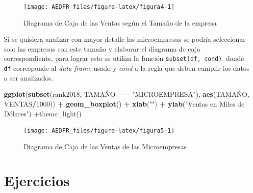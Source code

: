 \documentclass[letterpaper,]{book}
\newenvironment{Shaded}{\begin{snugshade}}{\end{snugshade}}
\newcommand{\DecValTok}[1]{\textcolor[rgb]{0.00,0.00,0.81}{#1}}
\newcommand{\KeywordTok}[1]{\textcolor[rgb]{0.13,0.29,0.53}{\textbf{#1}}}
\newcommand{\NormalTok}[1]{#1}
\newcommand{\OperatorTok}[1]{\textcolor[rgb]{0.81,0.36,0.00}{\textbf{#1}}}
\newcommand{\StringTok}[1]{\textcolor[rgb]{0.31,0.60,0.02}{#1}}
\begin{document}
\begin{figure}[h!]

{\centering \texttt{[image: AEDFR\_files/figure-latex/figura4-1]} 

}

\caption{Diagrama de Caja de las Ventas según el Tamaño de la empresa}\label{fig:figura4}
\end{figure}

Si se quisiera analizar con mayor detalle las microempresas se podría seleccionar solo las empresas con este tamaño y elaborar el diagrama de caja correspondiente, para lograr esto se utiliza la función \texttt{subset(df,\ cond)}. donde \texttt{df} corresponde al \emph{data frame} usado y \emph{cond} a la regla que deben cumplir los datos a ser analizados.

\begin{Shaded}
\begin{Highlighting}[]
\KeywordTok{ggplot}\NormalTok{(}\KeywordTok{subset}\NormalTok{(rank2018, TAMAÑO }\OperatorTok{==}\StringTok{ "MICROEMPRESA"}\NormalTok{), }\KeywordTok{aes}\NormalTok{(TAMAÑO, VENTAS}\OperatorTok{/}\DecValTok{1000}\NormalTok{)) }\OperatorTok{+}\StringTok{ }
\StringTok{  }\KeywordTok{geom_boxplot}\NormalTok{() }\OperatorTok{+}\StringTok{ }\KeywordTok{xlab}\NormalTok{(}\StringTok{""}\NormalTok{) }\OperatorTok{+}
\StringTok{  }\KeywordTok{ylab}\NormalTok{(}\StringTok{"Ventas en Miles de Dólares") +theme_light()}
\end{Highlighting}
\end{Shaded}

\begin{figure}[h!]

{\centering \texttt{[image: AEDFR\_files/figure-latex/figura5-1]} 

}

\caption{Diagrama de Caja de las Ventas de las Microempresas}\label{fig:figura5}
\end{figure}

\newpage

\hypertarget{ejercicios}{%
\section{Ejercicios}\label{ejercicios}}
\end{document}
